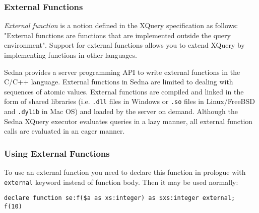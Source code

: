 \documentclass[a4paper,12pt]{article}
\begin{document}
\subsubsection{External Functions}

\emph{External function} is a notion defined in the XQuery specification
\cite{paper:query-language} as follows: "External functions are functions that
are implemented outside the query environment". Support for external functions
allows you to extend XQuery by implementing functions in other languages.

Sedna provides a server programming API to write external functions in the C/C++
language. External functions in Sedna are limited to dealing with sequences of
atomic values. External functions are compiled and linked in the form of shared
libraries (i.e. \verb!.dll! files in Windows or \verb!.so! files in
Linux/FreeBSD and \verb!.dylib! in Mac OS) and loaded by the server on demand.
Although the Sedna XQuery executor evaluates queries in a lazy manner, all
external function calls are evaluated in an eager manner.

\subsubsection*{Using External Functions}
To use an external function you need to declare this function in prologue with
\verb!external! keyword instead of function body. Then it may be used normally:

\small{
\begin{verbatim}
declare function se:f($a as xs:integer) as $xs:integer external;
f(10)
\end{verbatim}}
\end{document}

